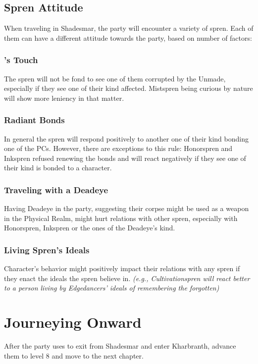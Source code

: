 \subsection{Spren Attitude}

When traveling in Shadesmar, the party will encounter a variety of spren. Each of them can have a different attitude towards the party, based on number of factors:

\subsubsection{\npcSjaAnat{}'s Touch}

The spren will not be fond to see one of them corrupted by the Unmade, especially if they see one of their kind affected. Mistspren being curious by nature will show more leniency in that matter.

\subsubsection{Radiant Bonds}

In general the spren will respond positively to another one of their kind bonding one of the PCs. However, there are exceptions to this rule: Honorspren and Inkspren refused renewing the bonds and will react negatively if they see one of their kind is bonded to a character.

\subsubsection{Traveling with a Deadeye}

Having Deadeye in the party, suggesting their corpse might be used as a weapon in the Physical Realm, might hurt relations with other spren, especially with Honorspren, Inkspren or the ones of the Deadeye's kind.

\subsubsection{Living Spren's Ideals}

Character's behavior might positively impact their relations with any spren if they enact the ideals the spren believe in. \textit{(e.g., Cultivationspren will react better to a person living by Edgedancers' ideals of remembering the forgotten)}












\section{Journeying Onward}

After the party uses \lootGateOpener{} to exit from Shadesmar and enter Kharbranth, advance them to level 8 and move to the next chapter.